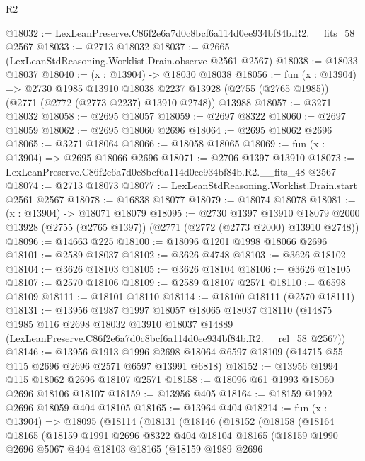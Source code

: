 \begin{lexlean}{R2}
\begin{coremodule}
@18032 := LexLeanPreserve.C86f2e6a7d0c8bcf6a114d0ee934bf84b.R2.__fits_58 @2567
@18033 := @2713 @18032
@18037 := @2665 (LexLeanStdReasoning.Worklist.Drain.observe @2561 @2567)
@18038 := @18033 @18037
@18040 := (x : @13904) -> @18030 @18038
@18056 := fun (x : @13904) =>
  @2730
    @1985
    @13910
    @18038
    @2237
    @13928
    (@2755 (@2765 @1985))
    (@2771 (@2772 (@2773 @2237) @13910 @2748))
    @13988
@18057 := @3271 @18032
@18058 := @2695 @18057
@18059 := @2697 @8322
@18060 := @2697 @18059
@18062 := @2695 @18060 @2696
@18064 := @2695 @18062 @2696
@18065 := @3271 @18064
@18066 := @18058 @18065
@18069 := fun (x : @13904) => @2695 @18066 @2696
@18071 := @2706 @1397 @13910
@18073 := LexLeanPreserve.C86f2e6a7d0c8bcf6a114d0ee934bf84b.R2.__fits_48 @2567
@18074 := @2713 @18073
@18077 := LexLeanStdReasoning.Worklist.Drain.start @2561 @2567
@18078 := @16838 @18077
@18079 := @18074 @18078
@18081 := (x : @13904) -> @18071 @18079
@18095 := @2730
    @1397
    @13910
    @18079
    @2000
    @13928
    (@2755 (@2765 @1397))
    (@2771 (@2772 (@2773 @2000) @13910 @2748))
@18096 := @14663 @225
@18100 := @18096 @1201 @1998 @18066 @2696
@18101 := @2589 @18037
@18102 := @3626 @4748
@18103 := @3626 @18102
@18104 := @3626 @18103
@18105 := @3626 @18104
@18106 := @3626 @18105
@18107 := @2570 @18106
@18109 := @2589 @18107 @2571
@18110 := @6598 @18109
@18111 := @18101 @18110
@18114 := @18100 @18111 (@2570 @18111)
@18131 := @13956
    @1987
    @1997
    @18057
    @18065
    @18037
    @18110
    (@14875
      @1985
      @116
      @2698
      @18032
      @13910
      @18037
      @14889
      (LexLeanPreserve.C86f2e6a7d0c8bcf6a114d0ee934bf84b.R2.__rel_58 @2567))
@18146 := @13956
    @1913
    @1996
    @2698
    @18064
    @6597
    @18109
    (@14715 @55 @115 @2696 @2696 @2571 @6597 @13991 @6818)
@18152 := @13956 @1994 @115 @18062 @2696 @18107 @2571
@18158 := @18096 @61 @1993 @18060 @2696 @18106 @18107
@18159 := @13956 @405
@18164 := @18159 @1992 @2696 @18059 @404 @18105
@18165 := @13964 @404
@18214 := fun (x : @13904) =>
  @18095
    (@18114
      (@18131
        (@18146
          (@18152
            (@18158
              (@18164
                @18165
                (@18159
                  @1991
                  @2696
                  @8322
                  @404
                  @18104
                  @18165
                  (@18159
                    @1990
                    @2696
                    @5067
                    @404
                    @18103
                    @18165
                    (@18159
                      @1989
                      @2696

\end{coremodule}
\end{lexlean}
